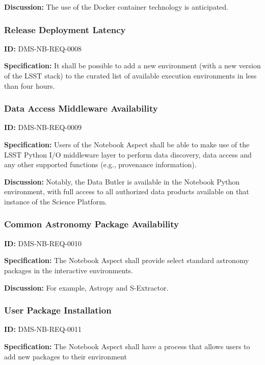 \documentclass[SE,toc]{lsstdoc}
\begin{document}
\textbf{Discussion:}
The use of the Docker container technology is anticipated.

\subsubsection{Release Deployment Latency}

\label{DMS-NB-REQ-0008}
\textbf{ID:} DMS-NB-REQ-0008

\textbf{Specification:}
It shall be possible to add a new environment (with a new version of the LSST stack) to the curated list of available execution environments in less than four hours.

\subsubsection{Data Access Middleware Availability}

\label{DMS-NB-REQ-0009}
\textbf{ID:} DMS-NB-REQ-0009

\textbf{Specification:}
Users of the Notebook Aspect shall be able to make use of the LSST Python I/O middleware layer to perform data discovery, data access and any other supported functions  (e.g., provenance information).

\textbf{Discussion:}
Notably, the Data Butler is available in the Notebook Python environment, with full access to all authorized data products available on that instance of the Science Platform.

\subsubsection{Common Astronomy Package Availability}

\label{DMS-NB-REQ-0010}
\textbf{ID:} DMS-NB-REQ-0010

\textbf{Specification:}
The Notebook Aspect shall provide select standard astronomy packages in the interactive environments.

\textbf{Discussion:}
For example, Astropy and S-Extractor.

\subsubsection{User Package Installation}

\label{DMS-NB-REQ-0011}
\textbf{ID:} DMS-NB-REQ-0011

\textbf{Specification:}
The Notebook Aspect shall have a process that allows users to add new packages to their environment
\end{document}
